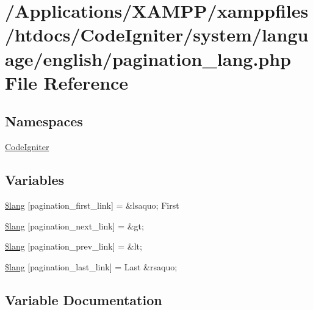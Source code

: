 \hypertarget{pagination__lang_8php}{}\section{/\+Applications/\+X\+A\+M\+P\+P/xamppfiles/htdocs/\+Code\+Igniter/system/language/english/pagination\+\_\+lang.php File Reference}
\label{pagination__lang_8php}
\subsection*{Namespaces}
\begin{DoxyCompactItemize}
\item 
 \mbox{\hyperlink{namespace_code_igniter}{Code\+Igniter}}
\end{DoxyCompactItemize}
\subsection*{Variables}
\begin{DoxyCompactItemize}
\item 
\mbox{\hyperlink{pagination__lang_8php_a5d1fae944efdc60a9c69d04543723762}{\$lang}} \mbox{[}\textquotesingle{}pagination\+\_\+first\+\_\+link\textquotesingle{}\mbox{]} = \textquotesingle{}\&lsaquo; First\textquotesingle{}
\item 
\mbox{\hyperlink{pagination__lang_8php_aceb23b65e41e7e133a35b2fe48d8fffa}{\$lang}} \mbox{[}\textquotesingle{}pagination\+\_\+next\+\_\+link\textquotesingle{}\mbox{]} = \textquotesingle{}\&gt;\textquotesingle{}
\item 
\mbox{\hyperlink{pagination__lang_8php_a724a9e6ef9da533324d3141faef796e8}{\$lang}} \mbox{[}\textquotesingle{}pagination\+\_\+prev\+\_\+link\textquotesingle{}\mbox{]} = \textquotesingle{}\&lt;\textquotesingle{}
\item 
\mbox{\hyperlink{pagination__lang_8php_a2e62411d434f4b79a8fee1bc0ec04dc5}{\$lang}} \mbox{[}\textquotesingle{}pagination\+\_\+last\+\_\+link\textquotesingle{}\mbox{]} = \textquotesingle{}Last \&rsaquo;\textquotesingle{}
\end{DoxyCompactItemize}


\subsection{Variable Documentation}
\mbox{\label{pagination__lang_8php_a5d1fae944efdc60a9c69d04543723762}} 
